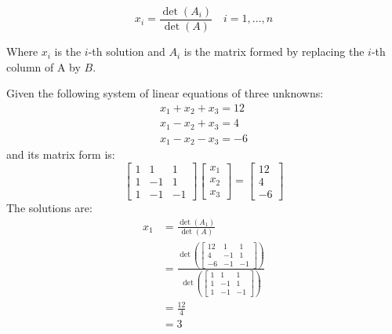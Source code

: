 \begin{equation*}
  x_i = \frac{\det(A_i)}{\det(A)} \quad i=1,\dots,n
\end{equation*}


Where \(x_i\) is the \(i\)-th solution and \(A_i\) is the matrix formed by replacing the \(i\)-th column of A by \(B\).

\begin{example}
  Given the following system of linear equations of three unknowns:
  \begin{equation*}
    \begin{array}{l}
      x_1 + x_2 + x_3 = 12 \\
      x_1 - x_2 + x_3 = 4 \\
      x_1 - x_2 - x_3 = -6
    \end{array}
  \end{equation*}
  and its matrix form is:
  \begin{equation*}
    \begin{bmatrix}
      1 & 1 & 1 \\
      1 & -1 & 1 \\
      1 & -1 & -1
    \end{bmatrix} \begin{bmatrix}
      x_1 \\
      x_2 \\
      x_3
    \end{bmatrix} = \begin{bmatrix}
      12 \\
      4 \\
      -6
    \end{bmatrix}
  \end{equation*}
  The solutions are:
  \begin{align*}
    x_1 &= \frac{\det(A_1)}{\det(A)} \\
    &= \frac{\det(\begin{bmatrix}
      12 & 1 & 1 \\
      4 & -1 & 1 \\
      -6 & -1 & -1
    \end{bmatrix} )}{\det(\begin{bmatrix}
      1 & 1 & 1 \\
      1 & -1 & 1 \\
      1 & -1 & -1
    \end{bmatrix} )} \\
    &= \frac{12}{4} \\
    &= 3
  \end{align*}

\end{example}
